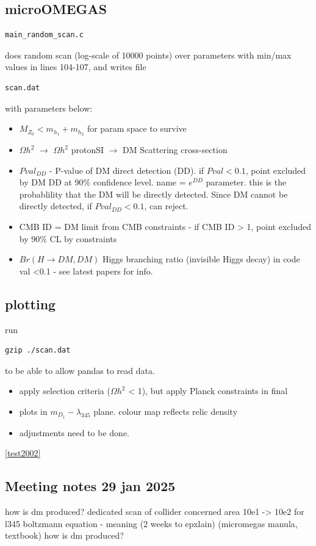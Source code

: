 \documentclass[11pt,a4paper]{article}
\begin{document}
\subsection{microOMEGAS}
\begin{verbatim}main_random_scan.c\end{verbatim} does random scan (log-scale of 10000 points) over parameters with min/max values in lines 104-107, and writes file \begin{verbatim}scan.dat\end{verbatim} with parameters below:
\begin{itemize}
    \item $M_{Z_0}<m_{h_1} + m_{h_2}$ for param space to survive
    \item $\Omega h^2$ $\rightarrow$ $\Omega h^2$ protonSI $\rightarrow$ DM Scattering cross-section
    \item $Pval_{DD}$ - P-value of DM direct detection (DD). if $Pval < 0.1$, point excluded by DM DD at $90\%$ confidence level. name = $e^{DD}$ parameter. this is the probablility that the DM will be directly detected. Since DM cannot be directly detected, if $Pval_{DD} < 0.1$, can reject.
    \item CMB ID = DM limit from CMB constraints - if CMB ID > 1, point excluded by $90\%$ CL by constraints
    \item $Br(H\rightarrow DM, DM)$ Higgs branching ratio (invisible Higgs decay) in code val <0.1 - see latest papers for info.
\end{itemize}
\subsection{plotting}
run \begin{verbatim}gzip ./scan.dat\end{verbatim} to be able to allow pandas to read data.
\begin{itemize}
    \item apply selection criteria ($\Omega h^2$ < 1), but apply Planck constraints in final
    \item plots in $m_{D_1}-\lambda_{345}$ plane. colour map reflects relic density
    \item adjustments need to be done.
\end{itemize}
\ref{test2002}


\subsection{Meeting notes 29 jan 2025}
how is dm produced?
dedicated scan of collider concerned area 10e1 -> 10e2 for l345
boltzmann equation - meaning (2 weeks to epxlain) (micromegas manula, textbook)
how is dm produced? 
\end{document}
